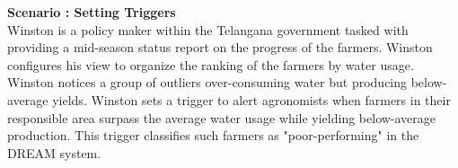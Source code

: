 \begin{flushleft}
\textbf{Scenario : Setting Triggers}\\\smallskip
Winston is a policy maker within the Telangana government tasked with providing a mid-season status report on the progress of the farmers. Winston configures his view to organize the ranking of the farmers by water usage. Winston notices a group of outliers over-consuming water but producing below-average yields. Winston sets a trigger to alert agronomists when farmers in their responsible area surpass the average water usage while yielding below-average production. This trigger classifies such farmers as "poor-performing" in the DREAM system. 
\end{flushleft}
